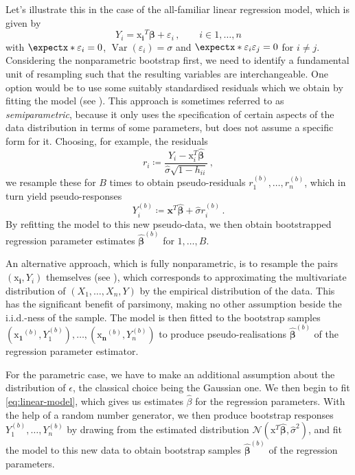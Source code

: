 \documentclass[a4paper]{book}
\begin{document}
Let's illustrate this in the case of the all-familiar linear regression model, which is given by
\begin{equation} \label{eq:linear-model}
  Y_i = \bm{\mathrm{x}_i}^T \bm{\beta} + \varepsilon_i \,, \qquad i \in {1, \dots, n}
\end{equation}
with $\expect{\varepsilon_i} = 0$, $\operatorname{Var}(\varepsilon_i) = \sigma$ and $\expect{\varepsilon_i \varepsilon_j} = 0$ for $i \neq j$. Considering the nonparametric bootstrap first, we need to identify a fundamental unit of resampling such that the resulting variables are interchangeable. One option would be to use some suitably standardised residuals which we obtain by fitting the model (see \cite[Algorithm 6.1]{davison}). This approach is sometimes referred to as \emph{semiparametric}, because it only uses the specification of certain aspects of the data distribution in terms of some parameters, but does not assume a specific form for it. Choosing, for example, the residuals
\begin{equation}
  r_i \coloneqq \frac{Y_i - \bm{\mathrm{x}}^T_i \widehat{\bm{\beta}}}{\widehat{\sigma} \sqrt{1 - h_{ii}}} \,,
\end{equation}
we resample these for $B$ times to obtain pseudo-residuals $r^{(b)}_1, \dots, r^{(b)}_n$, which in turn yield  pseudo-responses
\begin{equation}
  Y_i^{(b)} \coloneqq \mathbf{x}^T \widehat{\bm{\beta}} + \widehat{\sigma} r^{(b)}_i \,.
\end{equation}
By refitting the model to this new pseudo-data, we then obtain bootstrapped regression parameter estimates $\widehat{\bm{\beta}}^{(b)}$ for $1, \dots, B$.

An alternative approach, which is fully nonparametric, is to resample the pairs $(\bm{\mathrm{x}_i}, Y_i)$ themselves (see \cites[Section 9.5]{efron:intro}[Algorithm 6.2]{davison}), which corresponds to approximating the multivariate distribution of $(X_1, \dots, X_n, Y)$ by the empirical distribution of the data. This has the significant benefit of parsimony, making no other assumption beside the i.i.d.-ness of the sample. The model is then fitted to the bootstrap samples $(\bm{\mathrm{x}_1}^{(b)}, Y^{(b)}_1), \dots, (\bm{\mathrm{x}_n}^{(b)}, Y^{(b)}_n)$ to produce pseudo-realisations $\widehat{\bm{\beta}}^{(b)}$ of the regression parameter estimator.

For the parametric case, we have to make an additional assumption about the distribution of $\epsilon$, the classical choice being the Gaussian one. We then begin to fit \cref{eq:linear-model}, which gives us estimates $\widehat{\beta}$ for the regression parameters. With the help of a random number generator, we then produce bootstrap responses $Y^{(b)}_1, \dots, Y^{(b)}_n$ by drawing from the estimated distribution $\mathcal{N}(\bm{\mathrm{x}}^T \widehat{\bm{\beta}}, \widehat{\sigma}^2)$, and fit the model to this new data to obtain bootstrap samples $\widehat{\bm{\beta}}^{(b)}$ of the regression parameters.
\end{document}
